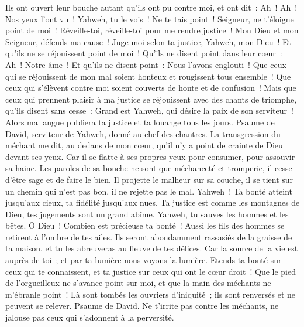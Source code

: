 \begin{multicols}{2}
Ils ont ouvert leur bouche autant qu'ils ont pu contre moi, et ont dit~: Ah~! Ah~! Nos yeux l'ont vu~!
Yahweh, tu le vois~! Ne te tais point~! Seigneur, ne t'éloigne point de moi~!
Réveille-toi, réveille-toi pour me rendre justice~! Mon Dieu et mon Seigneur, défends ma cause~!
Juge-moi selon ta justice, Yahweh, mon Dieu~! Et qu'ils ne se réjouissent point de moi~!
Qu'ils ne disent point dans leur cœur~: Ah~! Notre âme~! Et qu'ils ne disent point~: Nous l'avons englouti~!
Que ceux qui se réjouissent de mon mal soient honteux et rougissent tous ensemble~! Que ceux qui s'élèvent contre moi soient couverts de honte et de confusion~!
Mais que ceux qui prennent plaisir à ma justice se réjouissent avec des chants de triomphe, qu'ils disent sans cesse~: Grand est Yahweh, qui désire la paix de son serviteur~!
Alors ma langue publiera ta justice et ta louange tous les jours.
\VerseOne{}Psaume de David, serviteur de Yahweh, donné au chef des chantres.
La transgression du méchant me dit, au dedans de mon cœur, qu'il n'y a point de crainte de Dieu devant ses yeux.
Car il se flatte à ses propres yeux pour consumer, pour assouvir sa haine.
Les paroles de sa bouche ne sont que méchanceté et tromperie, il cesse d'être sage et de faire le bien.
Il projette le malheur sur sa couche, il se tient sur un chemin qui n'est pas bon, il ne rejette pas le mal.
Yahweh~! Ta bonté atteint jusqu'aux cieux, ta fidélité jusqu'aux nues.
Ta justice est comme les montagnes de Dieu, tes jugements sont un grand abîme. Yahweh, tu sauves les hommes et les bêtes.
Ô Dieu~! Combien est précieuse ta bonté~! Aussi les fils des hommes se retirent à l'ombre de tes ailes.
Ils seront abondamment rassasiés de la graisse de ta maison, et tu les abreuveras au fleuve de tes délices.
Car la source de la vie est auprès de toi~; et par ta lumière nous voyons la lumière.
Etends ta bonté sur ceux qui te connaissent, et ta justice sur ceux qui ont le cœur droit~!
Que le pied de l'orgueilleux ne s'avance point sur moi, et que la main des méchants ne m'ébranle point~!
Là sont tombés les ouvriers d'iniquité~; ils sont renversés et ne peuvent se relever.
\VerseOne{}Psaume de David.  Ne t'irrite pas contre les méchants, ne jalouse pas ceux qui s'adonnent à la perversité.

\end{multicols}
